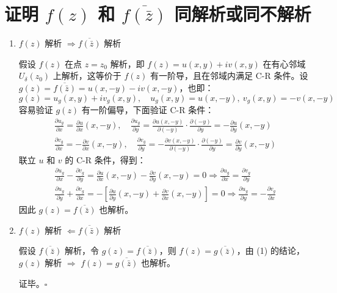 \documentclass[UTF8]{report}
\theoremstyle{MyLineTheoremStyle} %
\theoremstyle{MyBlockTheoremStyle} %
\theoremstyle{MySubsubsectionStyle} %
\begin{document}
\section{证明 $f(z)$ 和 $\overline{f(\bar{z})}$ 同解析或同不解析 }
\begin{enumerate}
\item $f(z)$ 解析 $\Longrightarrow \overline{f(\bar{z})}$ 解析

假设 $f(z)$ 在点 $z = z_0$ 解析，即 $f(z) = u(x,y) + iv(x,y)$ 在有心邻域 $U_{\delta}(z_0)$ 上解析，这等价于 $f(z)$ 有一阶导，且在邻域内满足 C-R 条件。设 $g(z) = \overline{f(\bar{z})} = u(x,-y) - iv(x,-y)$，也即：
\begin{equation*}
g(z) = u_g(x,y) + iv_g(x,y),\quad u_g(x,y) = u(x,-y),\ v_g(x,y) = -v(x,-y)
\end{equation*}
容易验证 $g(z)$ 有一阶偏导，下面验证 C-R 条件：
\begin{gather*}
\frac{\partial u_g }{\partial x } = \frac{\partial u}{\partial x }(x,-y) ,\quad
\frac{\partial u_g }{\partial y } = \frac{\partial u(x,-y) }{\partial (-y) }\cdot \frac{\partial (-y) }{\partial y } = -\frac{\partial u }{\partial y }(x,-y) \\ 
\frac{\partial v_g }{\partial x } = -\frac{\partial v}{\partial x }(x,-y) ,\quad
\frac{\partial v_g }{\partial y } = -\frac{\partial v(x,-y) }{\partial (-y) }\cdot \frac{\partial (-y) }{\partial y } = \frac{\partial v }{\partial y }(x,-y) 
\end{gather*}
联立 $u$ 和 $v$ 的 C-R 条件，得到：
\begin{gather*}
\frac{\partial u_g }{\partial x } - \frac{\partial v_g }{\partial y } = \frac{\partial u}{\partial x }(x,-y) - \frac{\partial v }{\partial y }(x,-y) = 0 \Longrightarrow \frac{\partial u_g }{\partial x } = \frac{\partial v_g }{\partial y }
\\ 
\frac{\partial u_g }{\partial y } + \frac{\partial v_g }{\partial x } = -\left[ \frac{\partial u }{\partial y }(x,-y) + \frac{\partial v}{\partial x }(x,-y)\right] = 0
\Longrightarrow 
\frac{\partial u_g }{\partial y } = -\frac{\partial v_g }{\partial x }
\end{gather*}
因此 $g(z) = \overline{f(\bar{z})}$ 也解析。

\item $f(z)$ 解析 $\Longleftarrow \overline{f(\bar{z})}$ 解析

假设 $\overline{f(\bar{z})}$ 解析，令 $g(z) = \overline{f(\bar{z})}$，则 $f(z) = \overline{g(\bar{z})}$，由 (1) 的结论，$g(z)$ 解析 $\Longrightarrow$ $f(z) = \overline{g(\bar{z})}$ 也解析。

证毕。$\square$
\end{enumerate}
\end{document}
